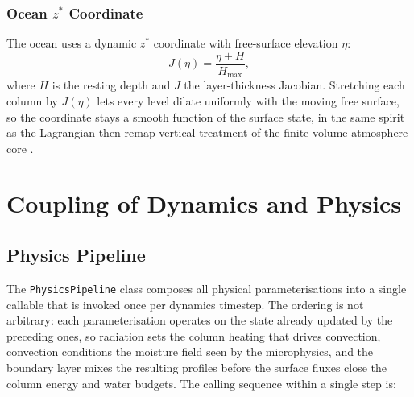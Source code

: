 \documentclass[11pt,twoside]{report}
\begin{document}
\subsection{Ocean $z^*$ Coordinate}

The ocean uses a dynamic $z^*$ coordinate with free-surface elevation $\eta$:
\begin{equation}
  J(\eta) = \frac{\eta+H}{H_{\max}},
\end{equation}
where $H$ is the resting depth and $J$ the layer-thickness Jacobian.  Stretching
each column by $J(\eta)$ lets every level dilate uniformly with the moving free
surface, so the coordinate stays a smooth function of the surface state, in the
same spirit as the Lagrangian-then-remap vertical treatment of the finite-volume
atmosphere core \citep{Lin2004}.


\chapter{Coupling of Dynamics and Physics}
\label{ch:coupling}

\section{Physics Pipeline}

The \texttt{PhysicsPipeline} class composes all physical parameterisations
into a single callable that is invoked once per dynamics timestep.  The ordering
is not arbitrary: each parameterisation operates on the state already updated by
the preceding ones, so radiation sets the column heating that drives convection,
convection conditions the moisture field seen by the microphysics, and the
boundary layer mixes the resulting profiles before the surface fluxes close the
column energy and water budgets.  The calling sequence within a single step is:
\end{document}
